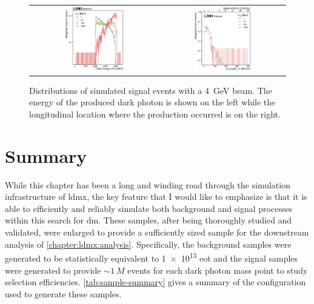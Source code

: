 \begin{figure}
  \centering
  \begin{tabular}{cc}
    \includegraphics[width=0.48\textwidth]{figures/ldmx/simulation/ap_energy.pdf} &
    \includegraphics[width=0.48\textwidth]{figures/ldmx/simulation/db_z.pdf}
  \end{tabular}
  \caption{Distributions of simulated signal events with a \qty{4}{\giga\electronvolt} beam.
  The energy of the produced dark photon is shown on the left while the longitudinal
  location where the production occurred is on the right.}
  \label{fig:db-character-energy-and-z}
\end{figure}

\section{Summary}
While this chapter has been a long and winding road through the simulation infrastructure
of \ac{ldmx}, the key feature that I would like to emphasize is that it is able to
efficiently and reliably simulate both background and signal processes within this search for \ac{dm}.
These samples, after being thoroughly studied and validated, were enlarged to provide
a sufficiently sized sample for the downstream analysis of \cref{chapter:ldmx:analysis}.
Specifically, the background samples were generated to be statistically equivalent to
\num{1e13} \ac{eot} and the signal samples were generated to provide $\sim \qty{1}{M}$
events for each dark photon mass point to study selection efficiencies.
\cref{tab:sample-summary} gives a summary of the configuration used to generate these
samples.

